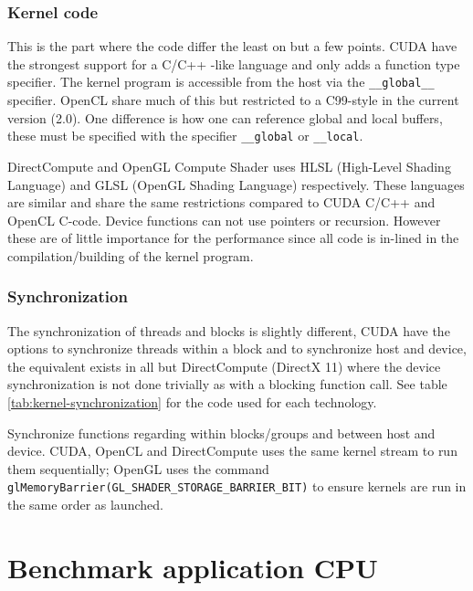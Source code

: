 \subsubsection{Kernel code}

This is the part where the code differ the least on but a few points. CUDA have the strongest support for a C/C++ -like language and only adds a function type specifier. The kernel program is accessible from the host via the \texttt{\_\_global\_\_} specifier. OpenCL share much of this but restricted to a C99-style in the current version (2.0). One difference is how one can reference global and local buffers, these must be specified with the specifier \texttt{\_\_global} or \texttt{\_\_local}.

DirectCompute and OpenGL Compute Shader uses HLSL (High-Level Shading Language) and GLSL (OpenGL Shading Language) respectively. These languages are similar and share the same restrictions compared to CUDA C/C++ and OpenCL C-code. Device functions can not use pointers or recursion. However these are of little importance for the performance since all code is in-lined in the compilation/building of the kernel program.

\subsubsection{Synchronization}

The synchronization of threads and blocks is slightly different, CUDA have the options to synchronize threads within a block and to synchronize host and device, the equivalent exists in all but DirectCompute (DirectX 11) where the device synchronization is not done trivially as with a blocking function call. See table \ref{tab:kernel-synchronization} for the code used for each technology.

\begin{table}[h!]
	\centering
	
	\caption{Synchronize functions regarding within blocks/groups and between host and device. CUDA, OpenCL and DirectCompute uses the same kernel stream to run them sequentially; OpenGL uses the command \texttt{glMemoryBarrier(GL\_SHADER\_STORAGE\_BARRIER\_BIT)} to ensure kernels are run in the same order as launched.}
	\label{tab:kernel-synchronization}
\end{table}

\section{Benchmark application CPU}

